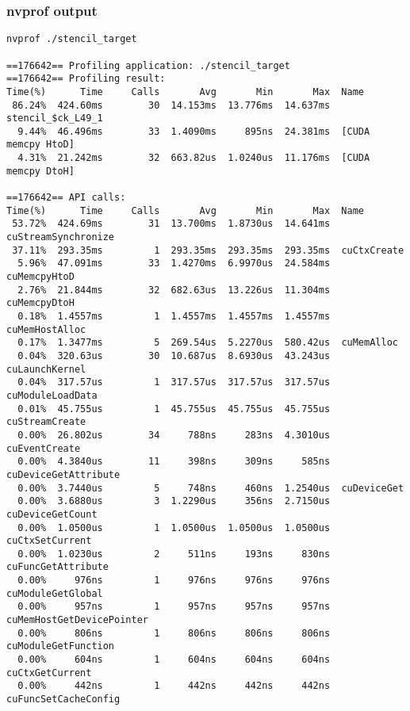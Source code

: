 \documentclass[aspectratio=169]{beamer}
\begin{document}
\begin{frame}[fragile]
\frametitle{nvprof output}
\begin{verbatim}
nvprof ./stencil_target

==176642== Profiling application: ./stencil_target                                                                                                                                                                                          
==176642== Profiling result:                                                                                                                                                                                                                
Time(%)      Time     Calls       Avg       Min       Max  Name
 86.24%  424.60ms        30  14.153ms  13.776ms  14.637ms  stencil_$ck_L49_1
  9.44%  46.496ms        33  1.4090ms     895ns  24.381ms  [CUDA memcpy HtoD]
  4.31%  21.242ms        32  663.82us  1.0240us  11.176ms  [CUDA memcpy DtoH]
                                                                               
==176642== API calls:                                           
Time(%)      Time     Calls       Avg       Min       Max  Name
 53.72%  424.69ms        31  13.700ms  1.8730us  14.641ms  cuStreamSynchronize
 37.11%  293.35ms         1  293.35ms  293.35ms  293.35ms  cuCtxCreate
  5.96%  47.091ms        33  1.4270ms  6.9970us  24.584ms  cuMemcpyHtoD                 
  2.76%  21.844ms        32  682.63us  13.226us  11.304ms  cuMemcpyDtoH
  0.18%  1.4557ms         1  1.4557ms  1.4557ms  1.4557ms  cuMemHostAlloc
  0.17%  1.3477ms         5  269.54us  5.2270us  580.42us  cuMemAlloc
  0.04%  320.63us        30  10.687us  8.6930us  43.243us  cuLaunchKernel
  0.04%  317.57us         1  317.57us  317.57us  317.57us  cuModuleLoadData
  0.01%  45.755us         1  45.755us  45.755us  45.755us  cuStreamCreate
  0.00%  26.802us        34     788ns     283ns  4.3010us  cuEventCreate
  0.00%  4.3840us        11     398ns     309ns     585ns  cuDeviceGetAttribute
  0.00%  3.7440us         5     748ns     460ns  1.2540us  cuDeviceGet
  0.00%  3.6880us         3  1.2290us     356ns  2.7150us  cuDeviceGetCount
  0.00%  1.0500us         1  1.0500us  1.0500us  1.0500us  cuCtxSetCurrent
  0.00%  1.0230us         2     511ns     193ns     830ns  cuFuncGetAttribute
  0.00%     976ns         1     976ns     976ns     976ns  cuModuleGetGlobal
  0.00%     957ns         1     957ns     957ns     957ns  cuMemHostGetDevicePointer
  0.00%     806ns         1     806ns     806ns     806ns  cuModuleGetFunction
  0.00%     604ns         1     604ns     604ns     604ns  cuCtxGetCurrent
  0.00%     442ns         1     442ns     442ns     442ns  cuFuncSetCacheConfig

\end{verbatim}
\end{frame}
\end{document}
